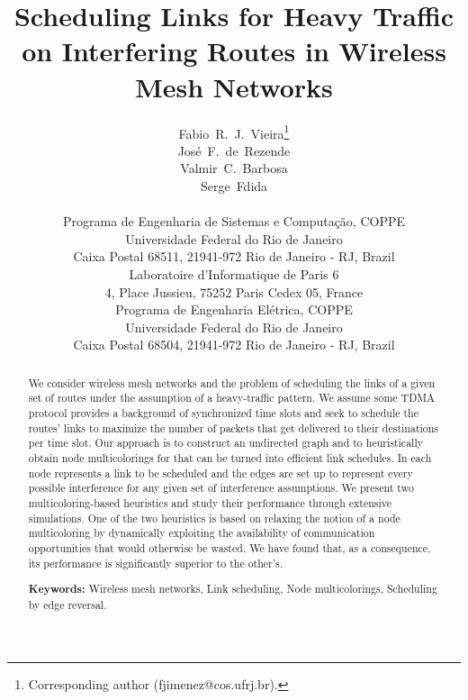 \documentclass{article}
\begin{document}
\title{Scheduling Links for Heavy Traffic on Interfering Routes in Wireless Mesh
Networks}

\author{Fabio~R.~J.~Vieira\thanks{Corresponding author (fjimenez@cos.ufrj.br).}\\
Jos\'e~F.~de~Rezende\\
Valmir~C.~Barbosa\\
Serge~Fdida\\
\\
Programa de Engenharia de Sistemas e Computa\c c\~ao, COPPE\\
Universidade Federal do Rio de Janeiro\\
Caixa Postal 68511, 21941-972 Rio de Janeiro - RJ, Brazil\\
Laboratoire d'Informatique de Paris 6\\
4, Place Jussieu, 75252 Paris Cedex 05, France\\
Programa de Engenharia El\'etrica, COPPE\\
Universidade Federal do Rio de Janeiro\\
Caixa Postal 68504, 21941-972 Rio de Janeiro - RJ, Brazil}

\date{}

\maketitle

\begin{abstract}
We consider wireless mesh networks and the problem of scheduling the links of a
given set of routes under the assumption of a heavy-traffic pattern. We assume
some TDMA protocol provides a background of synchronized time slots and seek to
schedule the routes' links to maximize the number of packets that get delivered
to their destinations per time slot. Our approach is to construct an undirected
graph  and to heuristically obtain node multicolorings for  that can be
turned into efficient link schedules. In  each node represents a link to be
scheduled and the edges are set up to represent every possible interference for
any given set of interference assumptions. We present two multicoloring-based
heuristics and study their performance through extensive simulations. One of the
two heuristics is based on relaxing the notion of a node multicoloring by
dynamically exploiting the availability of communication opportunities that
would otherwise be wasted. We have found that, as a consequence, its performance
is significantly superior to the other's.

\bigskip
\noindent
\textbf{Keywords:} Wireless mesh networks, Link scheduling, Node multicolorings,
Scheduling by edge reversal.
\end{abstract}
\end{document}
